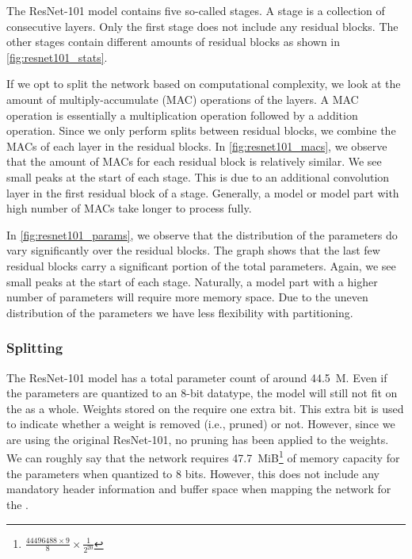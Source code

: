 The ResNet-101 model contains five so-called stages.
A stage is a collection of consecutive layers.
Only the first stage does not include any residual blocks.
The other stages contain different amounts of residual blocks as shown in \cref{fig:resnet101_stats}.

If we opt to split the network based on computational complexity, we look at the amount of multiply-accumulate (MAC) operations of the layers.
A MAC operation is essentially a multiplication operation followed by a addition operation.
Since we only perform splits between residual blocks, we combine the MACs of each layer in the residual blocks.
In \cref{fig:resnet101_macs}, we observe that the amount of MACs for each residual block is relatively similar.
We see small peaks at the start of each stage.
This is due to an additional convolution layer in the first residual block of a stage.
Generally, a model or model part with high number of MACs take longer to process fully.

In \cref{fig:resnet101_params}, we observe that the distribution of the parameters do vary significantly over the residual blocks.
The graph shows that the last few residual blocks carry a significant portion of the total parameters.
Again, we see small peaks at the start of each stage.
Naturally, a model part with a higher number of parameters will require more memory space.
Due to the uneven distribution of the parameters we have less flexibility with partitioning. 

\subsubsection{Splitting}
The ResNet-101 model has a total parameter count of around \SI{44.5}{M}.
Even if the parameters are quantized to an 8-bit datatype, the model will still not fit on the \graicore{} as a whole.
Weights stored on the \graicore{} require one extra bit.
This extra bit is used to indicate whether a weight is removed (i.e., pruned) or not.
However, since we are using the original ResNet-101, no pruning has been applied to the weights.
We can roughly say that the network requires \SI{47.7}{MiB}\footnote{$\frac{\num{44496488} \times 9}{8} \times \frac{1}{2^{20}}$} of memory capacity for the parameters when quantized to 8 bits.
However, this does not include any mandatory header information and buffer space when mapping the network for the \graicore{}. 

